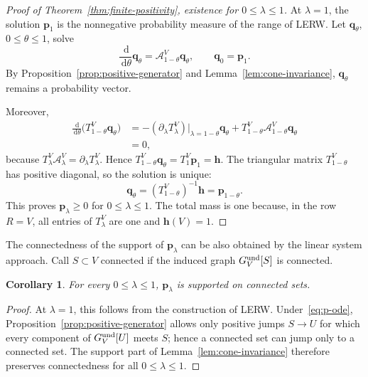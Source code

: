 \documentclass[11pt]{article}
\numberwithin{equation}{section}
\newcommand{\1}{\mathbf{1}}
\newtheorem{corollary}[theorem]{Corollary}
\newcommand{\dd}{\,\mathrm d}
\newcommand{\Ac}{\mathcal A}
\newcommand{\bp}{\mathbf p}
\newcommand{\bq}{\mathbf q}
\newcommand{\bh}{\mathbf h}
\begin{document}
\begin{proof}[{Proof of Theorem~\ref{thm:finite-positivity}, existence for \(0\le\lambda\le1\)}]
At \(\lambda=1\), the solution \(\bp_1\) is the nonnegative probability
measure of the range of LERW.  Let \(\bq_\theta\), \(0\le\theta\le1\), solve
\begin{equation}\label{eq:p-ode}
        \frac{\dd}{\dd\theta}\bq_\theta
        =\Ac_{1-\theta}^V\bq_\theta,
        \qquad
        \bq_0=\bp_1 .
\end{equation}
By Proposition~\ref{prop:positive-generator} and Lemma~\ref{lem:cone-invariance},
\(\bq_\theta\) remains a probability vector.

Moreover,
\[
\begin{aligned}
        \frac{\dd}{\dd\theta}\big(T_{1-\theta}^V\bq_\theta\big)
        &=-(\partial_\lambda T_\lambda^V)|_{\lambda=1-\theta}\bq_\theta
          +T_{1-\theta}^V\Ac_{1-\theta}^V\bq_\theta  \\
        &=0,
\end{aligned}
\]
because \(T_\lambda^V\Ac_\lambda^V=\partial_\lambda T_\lambda^V\).  Hence
\(T_{1-\theta}^V\bq_\theta=T_1^V\bp_1=\bh\).  The triangular matrix
\(T_{1-\theta}^V\) has positive diagonal, so the solution is unique:
\[
        \bq_\theta=(T_{1-\theta}^V)^{-1}\bh=\bp_{1-\theta} .
\]
This proves \(\bp_\lambda\ge0\) for \(0\le\lambda\le1\).  The total mass is
one because, in the row \(R=V\), all entries of \(T_\lambda^V\) are one and
\(\bh(V)=1\).
\end{proof}

The connectedness of the support of $\bp_\lambda$ can be also obtained by the linear system approach.
Call \(S\subset V\) connected if the induced graph
\(G_V^{\rm und}[S]\) is connected.  \begin{corollary}\label{cor:connected-support}
For every \(0\le\lambda\le1\),
\(\bp_\lambda\) is supported on connected sets.
\end{corollary}

\begin{proof}
At \(\lambda=1\), this follows from the construction of LERW. Under~\eqref{eq:p-ode},
Proposition~\ref{prop:positive-generator} allows only
positive jumps \(S\to U\) for which every component of
\(G_V^{\rm und}[U]\) meets \(S\); hence a connected set can jump
only to a connected set.  The support part
of Lemma~\ref{lem:cone-invariance} therefore preserves connectedness for all
\(0\le\lambda\le1\).
\end{proof}
\end{document}
